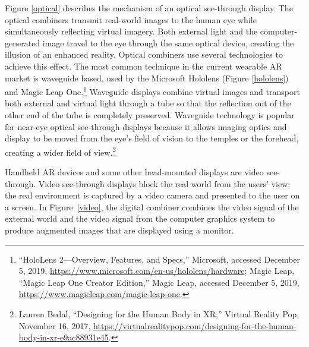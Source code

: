 \begin{enumerate}
Figure \ref{optical} describes the mechanism of an optical see-through display. The optical combiners transmit real-world images to the human eye while simultaneously reflecting virtual imagery. Both external light and the computer-generated image travel to the eye through the same optical device, creating the illusion of an enhanced reality. Optical combiners use several technologies to achieve this effect. The most common technique in the current wearable AR market is waveguide based, used by the Microsoft Hololens (Figure \ref{hololens}) and Magic Leap One.\footnote{“HoloLens 2—Overview, Features, and Specs,” Microsoft, accessed December 5, 2019, \url{https://www.microsoft.com/en-us/hololens/hardware}; Magic Leap, “Magic Leap One Creator Edition,” Magic Leap, accessed December 5, 2019, \url{https://www.magicleap.com/magic-leap-one}.} Waveguide displays combine virtual images and transport both external and virtual light through a tube so that the reflection out of the other end of the tube is completely preserved. Waveguide technology is popular for near-eye optical see-through displays because it allows imaging optics and display to be moved from the eye’s field of vision to the temples or the forehead, creating a wider field of view.\footnote{Lauren Bedal, “Designing for the Human Body in XR,” Virtual Reality Pop, November 16, 2017, \url{https://virtualrealitypop.com/designing-for-the-human-body-in-xr-e9ac88931e45}.}

\begin{figure}[!ht]
\vspace{-.1 in}
\end{figure}

Handheld AR devices and some other head-mounted displays are video see-through. Video see-through displays block the real world from the users’ view; the real environment is captured by a video camera and presented to the user on a screen. In Figure~\ref{video}, the digital combiner combines the video signal of the external world and the video signal from the computer graphics system to produce augmented images that are displayed using a monitor.
	

\end{enumerate}
